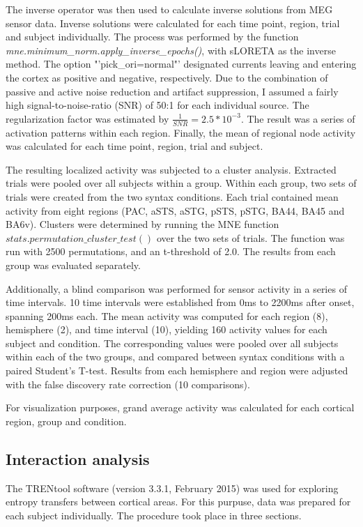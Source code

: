 The inverse operator was then used to calculate inverse solutions from MEG sensor data.
Inverse solutions were calculated for each time point, region, trial and subject individually.
The process was performed by the function \emph{mne.minimum\_norm.apply\_inverse\_epochs()}, with sLORETA as the inverse method.
The option "'pick\_ori=normal"' designated currents leaving and entering the cortex as positive and negative, respectively.
Due to the combination of passive and active noise reduction and artifact suppression, I assumed a fairly high signal-to-noise-ratio (SNR) of 50:1 for each individual source.
The regularization factor was estimated by $\frac{1}{SNR} = 2.5*10^{-3}$.
The result was a series of activation patterns within each region.
Finally, the mean of regional node activity was calculated for each time point, region, trial and subject.


The resulting localized activity was subjected to a cluster analysis.
Extracted trials were pooled over all subjects within a group.
Within each group, two sets of trials were created from the two syntax conditions.
Each trial contained mean activity from eight regions (PAC, aSTS, aSTG, pSTS, pSTG, BA44, BA45 and BA6v).
Clusters were determined by running the MNE function $stats.permutation\_cluster\_test()$ \cite{3.3.clustertest} over the two sets of trials.
The function was run with 2500 permutations, and an t-threshold of 2.0.
The results from each group was evaluated separately.

Additionally, a blind comparison was performed for sensor activity in a series of time intervals.
10 time intervals were established from 0ms to 2200ms after onset, spanning 200ms each.
The mean activity was computed for each region (8), hemisphere (2), and time interval (10), yielding 160 activity values for each subject and condition.
The corresponding values were pooled over all subjects within each of the two groups, and compared between syntax conditions with a paired Student's T-test.
Results from each hemisphere and region were adjusted with the false discovery rate correction (10 comparisons).

For visualization purposes, grand average activity was calculated for each cortical region, group and condition.


\subsection{Interaction analysis}

The TRENtool software (version 3.3.1, February 2015) was used for exploring entropy transfers between cortical areas.
For this purpuse, data was prepared for each subject individually.
The procedure took place in three sections.


